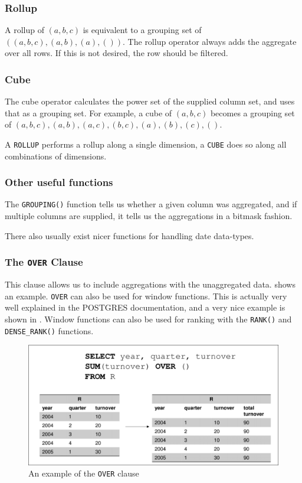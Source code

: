 \documentclass{article}
\begin{document}
\subsubsection{Rollup}
A rollup of $(a,b,c)$ is equivalent to a grouping set of $((a,b,c), (a,b), (a), ())$.
The rollup operator always adds the aggregate over all rows.
If this is not desired, the row should be filtered.

\subsubsection{Cube}
The cube operator calculates the power set of the supplied column set, and uses that as a grouping set.
For example, a cube of $(a,b,c)$ becomes a grouping set of $(a,b,c), (a,b), (a,c), (b,c), (a), (b), (c), ()$.

\begin{keypointbox}
    A \lstinline{ROLLUP} performs a rollup along a single dimension, a \lstinline{CUBE} does so along all combinations of dimensions.
\end{keypointbox}

\subsubsection{Other useful functions}
The \lstinline{GROUPING()} function tells us whether a given column was aggregated, and if multiple columns are supplied, it tells us the aggregations in a bitmask fashion.

There also usually exist nicer functions for handling date data-types.

\subsubsection{The \lstinline{OVER} Clause}
This clause allows us to include aggregations with the unaggregated data.
 shows an example.
\lstinline{OVER} can also be used for window functions.
This is actually very well explained in the POSTGRES documentation, and a very nice example is shown in .
Window functions can also be used for ranking with the \lstinline{RANK()} and \lstinline{DENSE_RANK()} functions.

\begin{figure}[hp]
    \centering
    \includegraphics[width=\textwidth]{over.png}
    \caption{An example of the \lstinline{OVER} clause}
    \label{fig:over}
\end{figure}
\end{document}
